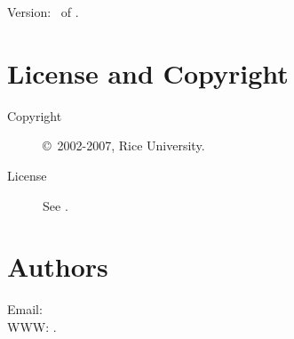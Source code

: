 \documentclass[english]{article}
\begin{document}
Version: \Version\ of \Date.

\section{License and Copyright}

\begin{description}
\item[Copyright] \copyright\ 2002-2007, Rice University.
\item[License] See .
\end{description}

\section{Authors}

Email:  \\
WWW: .

\LatexManEnd
\end{document}
